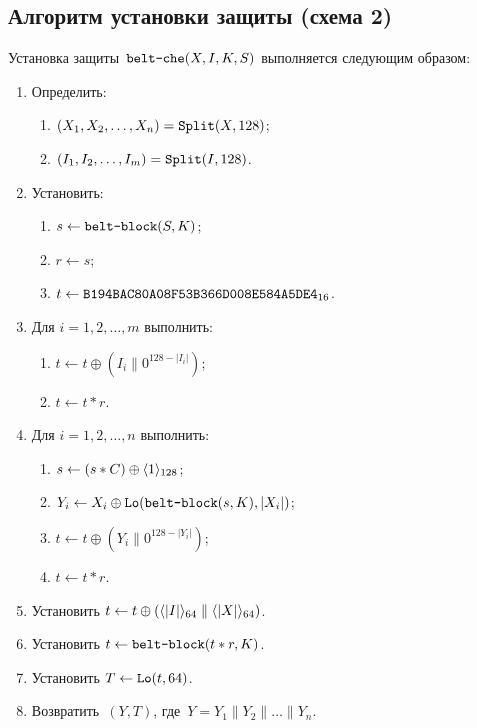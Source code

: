 \subsection{Алгоритм установки защиты (схема 2)}\label{AE.CHE.Wrap}

Установка защиты~$\texttt{belt-che}(X,I,K,S)$ выполняется следующим образом:
\begin{enumerate}
\item
Определить: 
\begin{enumerate}
\item
$(X_1,X_2,\ldots,X_n)=\mathop{\texttt{Split}}\nolimits(X, 128)$;
\item
$(I_1,I_2,\ldots,I_m)=\mathop{\texttt{Split}}\nolimits(I, 128)$. 
\end{enumerate}
\item
Установить:
\begin{enumerate}
\item
$s\leftarrow\texttt{belt-block}(S,K)$;
\item
$r\leftarrow s$;
\item
$t\leftarrow\texttt{B194BAC80A08F53B366D008E584A5DE4}_{16}$.
\end{enumerate}

\item
Для $i=1,2,\ldots,m$ выполнить:
\begin{enumerate}
\item
$t\leftarrow t\oplus (I_i\parallel 0^{128-|I_i|})$;
\item
$t\leftarrow t\ast r$.
\end{enumerate}

\item
Для $i=1,2,\ldots,n$ выполнить:
\begin{enumerate}
\item
$s\leftarrow (s\ast C)\oplus\langle1\rangle_{128}$;
\item
$Y_i\leftarrow X_i\oplus\mathop{\texttt{Lo}}\nolimits(\texttt{belt-block}(s,K), |X_i|)$;
\item
$t\leftarrow t\oplus (Y_i\parallel 0^{128-|Y_i|})$;
\item
$t\leftarrow t\ast r$.
\end{enumerate}

\item
Установить
$t\leftarrow t\oplus 
(\langle|I|\rangle_{64}\parallel\langle|X|\rangle_{64})$.
\item
Установить
$t\leftarrow \texttt{belt-block}(t\ast r,K)$.
\item
Установить
$T\leftarrow \mathop{\texttt{Lo}}\nolimits(t, 64)$.
\item
Возвратить~$(Y,T)$, 
где~$Y=Y_1\parallel Y_2\parallel\ldots\parallel Y_n$.
\end{enumerate}

